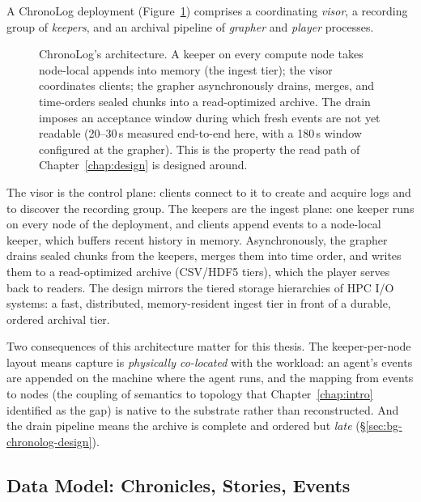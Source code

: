 A ChronoLog deployment (Figure~\ref{fig:chronoarch}) comprises a
coordinating \emph{visor}, a recording group of \emph{keepers}, and an
archival pipeline of \emph{grapher} and \emph{player} processes.

\begin{figure}[t]
  \centering
  
  \caption[ChronoLog's architecture: visor, keepers, grapher, player]{ChronoLog's architecture. A keeper on every compute node takes
  node-local appends into memory (the ingest tier); the visor coordinates
  clients; the grapher asynchronously drains, merges, and time-orders
  sealed chunks into a read-optimized archive. The drain imposes an
  acceptance window during which fresh events are not yet readable
  (20--30\,s measured end-to-end here, with a 180\,s window configured
  at the grapher). This is the property the read path of
  Chapter~\ref{chap:design} is designed around.}
  \label{fig:chronoarch}
\end{figure}

The visor is the control plane: clients connect to
it to create and acquire logs and to discover the recording group. The
keepers are the ingest plane: one keeper runs on every node of the
deployment, and clients append events to a node-local keeper, which buffers
recent history in memory. Asynchronously, the grapher drains sealed chunks
from the keepers, merges them into time order, and writes them to a
read-optimized archive (CSV/HDF5 tiers), which the player serves back to
readers. The design mirrors the tiered storage hierarchies of HPC I/O
systems: a fast, distributed, memory-resident ingest tier in front of a
durable, ordered archival tier.

Two consequences of this architecture matter for this thesis. The
keeper-per-node layout means capture is \emph{physically co-located} with the
workload: an agent's events are appended on the machine where the agent runs,
and the mapping from events to nodes (the coupling of semantics to
topology that Chapter~\ref{chap:intro} identified as the gap) is native to
the substrate rather than reconstructed. And the drain pipeline means the
archive is complete and ordered but \emph{late} (\S\ref{sec:bg-chronolog-design}).

\subsection{Data Model: Chronicles, Stories, Events}
\label{sec:bg-chronolog-model}

